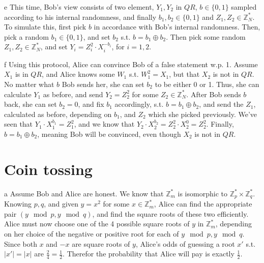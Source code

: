 \documentclass{article}
\begin{document}
\begin{paragraph}
    e This time, Bob's view consists of two element, \(Y_1, Y_2\) in \(QR\), \(b \in \{0, 1\}\) sampled according to his internal randomness, and finally \(b_1, b_2 \in \{0, 1\}\) and \(Z_1, Z_2 \in \mathbb{Z}^*_N\). To simulate this, first pick \(b\) in accordance with Bob's internal randomness. Then, pick a random \(b_1 \in \{0, 1\}\), and set \(b_2\) s.t. \(b = b_1 \oplus b_2\). Then pick some random \(Z_1, Z_2 \in \mathbb{Z}^*_N\), and set \(Y_i = Z_i^2 \cdot X_i^{-b_i}\), for \(i = 1, 2\).
\end{paragraph}

\begin{paragraph}
    f Using this protocol, Alice can convince Bob of a false statement w.p. 1. Assume \(X_1\) is in \(QR\), and Alice knows some \(W_1\) s.t. \(W_1^2 = X_1\), but that \(X_2\) is not in \(QR\). No matter what \(b\) Bob sends her, she can set \(b_2\) to be either 0 or 1. Thus, she can calculate \(Y_1\) as before, and send \(Y_2 = Z_2^2\) for some \(Z_2 \in \mathbb{Z}^*_N\). After Bob sends \(b\) back, she can set \(b_2 = 0\), and fix \(b_1\) accordingly, s.t. \(b = b_1 \oplus b_2\), and send the \(Z_1\), calculated as before, depending on \(b_1\), and \(Z_2\) which she picked previously. We've seen that \(Y_1 \cdot X_1^{b_1} = Z_1^2\), and we know that \(Y_2 \cdot X_2^{b_2} = Z_2^2 \cdot X_2^0 = Z_2^2\). Finally, \(b = b_1 \oplus b_2\), meaning Bob will be convinced, even though \(X_2\) is not in \(QR\).
\end{paragraph}

\section{Coin tossing}
\begin{paragraph}
    a Assume Bob and Alice are honest. We know that \(\mathbb{Z}^*_m\) is isomorphic to \(\mathbb{Z}^*_p \times \mathbb{Z}^*_q\). Knowing \(p, q\), and given \(y = x^2\) for some \(x \in \mathbb{Z}^*_m\), Alice can find the appropriate pair \((y \mod{p}, y \mod{q})\), and find the square roots of these two efficiently. Alice must now choose one of the 4 possible square roots of \(y\) in \(\mathbb{Z}^*_m\), depending on her choice of the negative or positive root for each of \(y \mod{p}, y \mod{q}\). Since both \(x\) and \(-x\) are square roots of \(y\), Alice's odds of guessing a root \(x'\) s.t. \(|x'| = |x|\) are \(\frac{2}{4} = \frac{1}{2}\). Therefor the probability that Alice will pay is exactly \(\frac{1}{2}\).
\end{paragraph}
\end{document}

